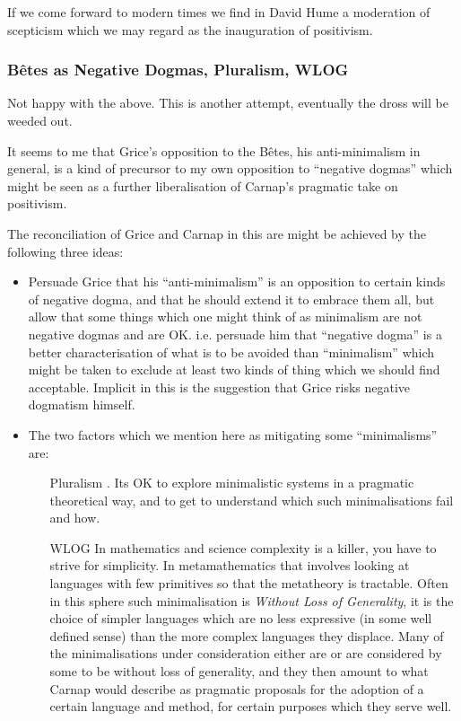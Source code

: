 \documentclass[10pt,titlepage]{book}
\begin{document}
If we come forward to modern times we find in David Hume a moderation of scepticism which we may regard as the inauguration of positivism.

\subsubsection{B\^etes as Negative Dogmas, Pluralism, WLOG}

Not happy with the above.
This is another attempt, eventually the dross will be weeded out.

It seems to me that Grice's opposition to the B\^etes, his anti-minimalism in general, is a kind of precursor to my own opposition to ``negative dogmas'' which might be seen as a further liberalisation of Carnap's pragmatic take on positivism.

The reconciliation of Grice and Carnap in this are might be achieved by the following three ideas:

\begin{itemize}
\item Persuade Grice that his ``anti-minimalism'' is an opposition to certain kinds of negative dogma, and that he should extend it to embrace them all, but allow that some things which one might think of as minimalism are not negative dogmas and are OK.
i.e. persuade him that ``negative dogma'' is a better characterisation of what is to be avoided than ``minimalism'' which might be taken to exclude at least two kinds of thing which we should find acceptable.
Implicit in this is the suggestion that Grice risks negative dogmatism himself.

\item The two factors which we mention here as mitigating some ``minimalisms'' are:

\begin{itemize}

\item [Pluralism].  Its OK to explore minimalistic systems in a pragmatic theoretical way, and to get to understand which such minimalisations fail and how.

\item [WLOG] In mathematics and science complexity is a killer, you have to strive for simplicity.
In metamathematics that involves looking at languages with few primitives so that the metatheory is tractable.
Often in this sphere such minimalisation is {\it Without Loss of Generality}, it is the choice of simpler languages which are no less expressive (in some well defined sense) than the more complex languages they displace.
Many of the minimalisations under consideration either are or are considered by some to be without loss of generality, and they then amount to what Carnap would describe as pragmatic proposals for the adoption of a certain language and method, for certain purposes which they serve well.
\end{itemize}

\end{itemize}
\end{document}
